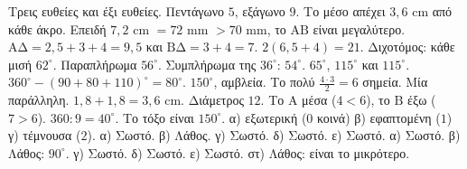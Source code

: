  Τρεις ευθείες και έξι ευθείες.
 Πεντάγωνο $5$, εξάγωνο $9$.
 Το μέσο απέχει $3{,}6$ cm από κάθε άκρο. Επειδή $7{,}2$ cm $=72$ mm $>70$ mm, το $\mathrm{ΑΒ}$ είναι μεγαλύτερο.
 $\mathrm{ΑΔ}=2{,}5+3+4=9{,}5$ και $\mathrm{ΒΔ}=3+4=7$.
 $2(6{,}5+4)=21$.
 Διχοτόμος: κάθε μισή $62^\circ$. Παραπλήρωμα $56^\circ$. Συμπλήρωμα της $36^\circ$: $54^\circ$.
 $65^\circ$, $115^\circ$ και $115^\circ$.
 $360^\circ-(90+80+110)^\circ=80^\circ$.
 $150^\circ$, αμβλεία.
 Το πολύ $\frac{4\cdot3}{2}=6$ σημεία. Μία παράλληλη.
 $1{,}8+1{,}8=3{,}6$ cm.
 Διάμετρος $12$. Το $\mathrm{Α}$ μέσα ($4<6$), το $\mathrm{Β}$ έξω ($7>6$).
 $360:9=40^\circ$. Το τόξο είναι $150^\circ$.
 α) εξωτερική ($0$ κοινά) \quad β) εφαπτομένη ($1$) \quad γ) τέμνουσα ($2$).
 α) Σωστό. β) Λάθος. γ) Σωστό. δ) Σωστό. ε) Σωστό.
 α) Σωστό. β) Λάθος: $90^\circ$. γ) Σωστό. δ) Σωστό. ε) Σωστό. στ) Λάθος: είναι το μικρότερο.
